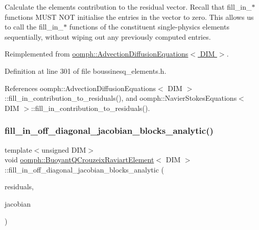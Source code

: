 Calculate the element\textquotesingle{}s contribution to the residual vector. Recall that fill\+\_\+in\+\_\+$\ast$ functions M\+U\+ST N\+OT initialise the entries in the vector to zero. This allows us to call the fill\+\_\+in\+\_\+$\ast$ functions of the constituent single-\/physics elements sequentially, without wiping out any previously computed entries. 



Reimplemented from \hyperlink{classoomph_1_1AdvectionDiffusionEquations_ae56ee6b085c75be438a598244c527fb5}{oomph\+::\+Advection\+Diffusion\+Equations$<$ D\+I\+M $>$}.



Definition at line 301 of file boussinesq\+\_\+elements.\+h.



References oomph\+::\+Advection\+Diffusion\+Equations$<$ D\+I\+M $>$\+::fill\+\_\+in\+\_\+contribution\+\_\+to\+\_\+residuals(), and oomph\+::\+Navier\+Stokes\+Equations$<$ D\+I\+M $>$\+::fill\+\_\+in\+\_\+contribution\+\_\+to\+\_\+residuals().

\mbox{\label{classoomph_1_1BuoyantQCrouzeixRaviartElement_aa344d9c1a36501baefc4afd56f227b94}} 
\subsubsection{\texorpdfstring{fill\+\_\+in\+\_\+off\+\_\+diagonal\+\_\+jacobian\+\_\+blocks\+\_\+analytic()}{fill\_in\_off\_diagonal\_jacobian\_blocks\_analytic()}}
{\footnotesize\ttfamily template$<$unsigned D\+IM$>$ \\
void \hyperlink{classoomph_1_1BuoyantQCrouzeixRaviartElement}{oomph\+::\+Buoyant\+Q\+Crouzeix\+Raviart\+Element}$<$ D\+IM $>$\+::fill\+\_\+in\+\_\+off\+\_\+diagonal\+\_\+jacobian\+\_\+blocks\+\_\+analytic (\begin{DoxyParamCaption}\item[{\hyperlink{classoomph_1_1Vector}{Vector}$<$ double $>$ \&}]{residuals,  }\item[{\hyperlink{classoomph_1_1DenseMatrix}{Dense\+Matrix}$<$ double $>$ \&}]{jacobian }\end{DoxyParamCaption})\hspace{0.3cm}{\ttfamily [inline]}}




